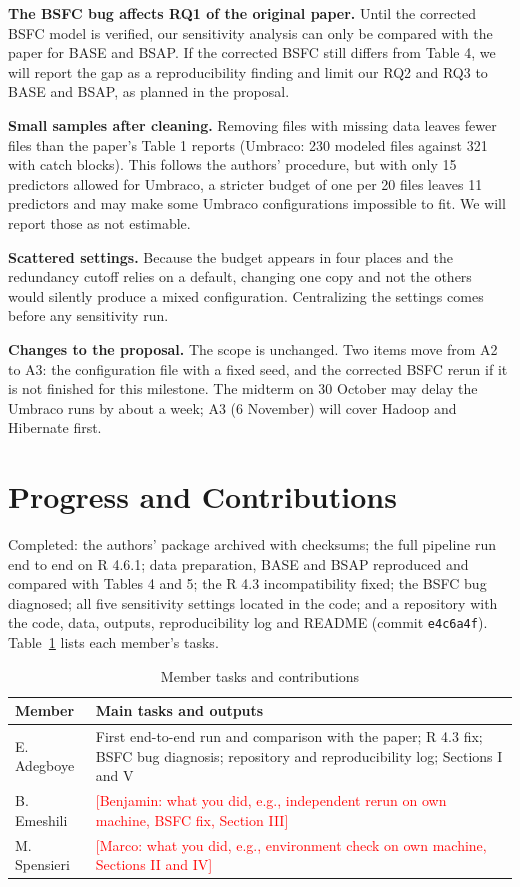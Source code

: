 \documentclass[conference]{IEEEtran}
\newcommand{\todo}[1]{\textcolor{red}{[#1]}}
\begin{document}
\textbf{The BSFC bug affects RQ1 of the original paper.} Until the corrected BSFC model is verified, our sensitivity analysis can only be compared with the paper for BASE and BSAP. If the corrected BSFC still differs from Table 4, we will report the gap as a reproducibility finding and limit our RQ2 and RQ3 to BASE and BSAP, as planned in the proposal.

\textbf{Small samples after cleaning.} Removing files with missing data leaves fewer files than the paper's Table 1 reports (Umbraco: 230 modeled files against 321 with catch blocks). This follows the authors' procedure, but with only 15 predictors allowed for Umbraco, a stricter budget of one per 20 files leaves 11 predictors and may make some Umbraco configurations impossible to fit. We will report those as not estimable.

\textbf{Scattered settings.} Because the budget appears in four places and the redundancy cutoff relies on a default, changing one copy and not the others would silently produce a mixed configuration. Centralizing the settings comes before any sensitivity run.

\textbf{Changes to the proposal.} The scope is unchanged. Two items move from A2 to A3: the configuration file with a fixed seed, and the corrected BSFC rerun if it is not finished for this milestone. The midterm on 30 October may delay the Umbraco runs by about a week; A3 (6 November) will cover Hadoop and Hibernate first.

\section{Progress and Contributions}
Completed: the authors' package archived with checksums; the full pipeline run end to end on R 4.6.1; data preparation, BASE and BSAP reproduced and compared with Tables 4 and 5; the R 4.3 incompatibility fixed; the BSFC bug diagnosed; all five sensitivity settings located in the code; and a repository with the code, data, outputs, reproducibility log and README (commit \texttt{e4c6a4f}). Table~\ref{tab:contrib} lists each member's tasks.

\begin{table}[H]
\centering
\caption{Member tasks and contributions}
\label{tab:contrib}
\footnotesize
\begin{tabular}{@{}p{}p{}@{}}
\toprule
Member & Main tasks and outputs \\
\midrule
E. Adegboye & First end-to-end run and comparison with the paper; R 4.3 fix; BSFC bug diagnosis; repository and reproducibility log; Sections I and V \\
B. Emeshili & \todo{Benjamin: what you did, e.g., independent rerun on own machine, BSFC fix, Section III} \\
M. Spensieri & \todo{Marco: what you did, e.g., environment check on own machine, Sections II and IV} \\
\bottomrule
\end{tabular}
\end{table}
\end{document}
